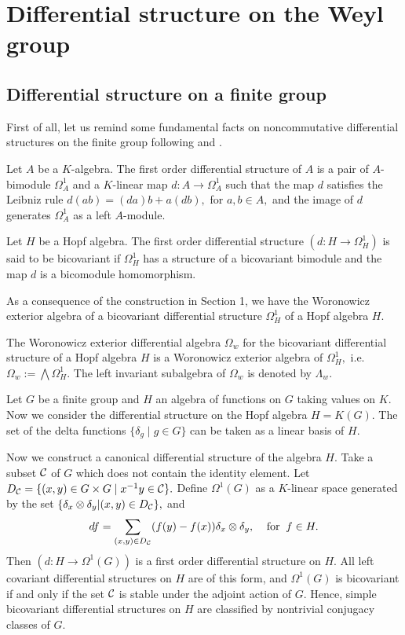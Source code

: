 \section{Differential structure on the Weyl group}
\subsection{Differential structure on a finite group}
First of all, let us remind some fundamental 
facts on noncommutative differential structures on the 
finite group following \cite{BMDS} and \cite{Maj}. 
\begin{dfn} Let $A$ be a $K$-algebra. The 
first order differential structure of $A$ is a pair of 
$A$-bimodule $\Omega_A^1$ and a $K$-linear map $d: A 
\rightarrow \Omega_A^1$ such that the map $d$ satisfies 
the Leibniz rule $d(ab)=(da)b+a(db),$ for $a,b\in A,$ 
and the image of $d$ generates $\Omega_A^1$ as a left 
$A$-module. 
\end{dfn}
\begin{dfn}
Let $H$ be a Hopf algebra. The first order differential 
structure $(d: H \rightarrow \Omega_H^1)$ is said to be 
bicovariant if $\Omega_H^1$ has a structure of a bicovariant 
bimodule and the map $d$ is a bicomodule homomorphism. 
\end{dfn}
As a consequence of the construction in Section 1, we 
have the Woronowicz exterior algebra of 
a bicovariant differential structure  $\Omega_H^1$
of a Hopf algebra $H.$ 
\begin{dfn}
The Woronowicz exterior differential algebra $\Omega_w$ for 
the bicovariant differential structure of a Hopf algebra 
$H$ is a Woronowicz exterior algebra of $\Omega_H^1,$ i.e. 
$\Omega_w := \bigwedge \Omega_H^1.$ The left invariant 
subalgebra of $\Omega_w$ is denoted by $\Lambda_w.$ 
\end{dfn}
Let $G$ be a finite group and $H$ an algebra of 
functions on $G$ taking values on $K.$ 
Now we consider the 
differential structure on the Hopf algebra 
$H=K(G).$ The set of 
the delta functions $\{ \delta_g \; | \; g\in G \}$ can be 
taken as a linear basis of $H.$ 

Now we construct a canonical differential structure of the 
algebra $H.$ Take a subset ${\cal C}$ of $G$ 
which does not contain the identity element. Let 
$D_{\cal C}= \{ (x,y)\in G \times G \; | \; x^{-1}y 
\in {\cal C} \} .$ Define $\Omega^1(G)$ as a $K$-linear space 
generated by the set $\{ \delta_x \otimes \delta_y |(x,y)\in 
D_{\cal C} \} ,$ and 
\[ df= \sum_{(x,y)\in D_{\cal C}}(f(y)-f(x))\delta_x 
\otimes \delta_y , \; \; \; \; \textrm{for} \; \; 
f\in H. \]
Then $(d: H \rightarrow \Omega^1(G))$ is a first order 
differential structure on $H.$ All left covariant 
differential structures on $H$ are of this form, and 
$\Omega^1(G)$ is bicovariant if and only if the set 
${\cal C}$ is stable under the adjoint action of $G.$ 
Hence, simple bicovariant differential structures on 
$H$ are classified by nontrivial conjugacy classes of $G.$ 

